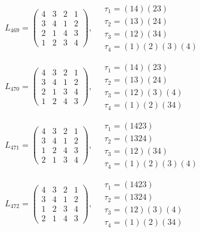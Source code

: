 $L_{469} = \begin{pmatrix} 4 & 3 & 2 & 1 \\ 3 & 4 & 1 & 2 \\ 2 & 1 & 4 & 3 \\ 1 & 2 & 3 & 4 \end{pmatrix}, \quad \begin{matrix} \tau_{1} = (1 4)(2 3) \\ \tau_{2} = (1 3)(2 4) \\ \tau_{3} = (1 2)(3 4) \\ \tau_{4} = (1)(2)(3)(4) \end{matrix}$

$L_{470} = \begin{pmatrix} 4 & 3 & 2 & 1 \\ 3 & 4 & 1 & 2 \\ 2 & 1 & 3 & 4 \\ 1 & 2 & 4 & 3 \end{pmatrix}, \quad \begin{matrix} \tau_{1} = (1 4)(2 3) \\ \tau_{2} = (1 3)(2 4) \\ \tau_{3} = (1 2)(3)(4) \\ \tau_{4} = (1)(2)(3 4) \end{matrix}$

$L_{471} = \begin{pmatrix} 4 & 3 & 2 & 1 \\ 3 & 4 & 1 & 2 \\ 1 & 2 & 4 & 3 \\ 2 & 1 & 3 & 4 \end{pmatrix}, \quad \begin{matrix} \tau_{1} = (1 4 2 3) \\ \tau_{2} = (1 3 2 4) \\ \tau_{3} = (1 2)(3 4) \\ \tau_{4} = (1)(2)(3)(4) \end{matrix}$

$L_{472} = \begin{pmatrix} 4 & 3 & 2 & 1 \\ 3 & 4 & 1 & 2 \\ 1 & 2 & 3 & 4 \\ 2 & 1 & 4 & 3 \end{pmatrix}, \quad \begin{matrix} \tau_{1} = (1 4 2 3) \\ \tau_{2} = (1 3 2 4) \\ \tau_{3} = (1 2)(3)(4) \\ \tau_{4} = (1)(2)(3 4) \end{matrix}$

